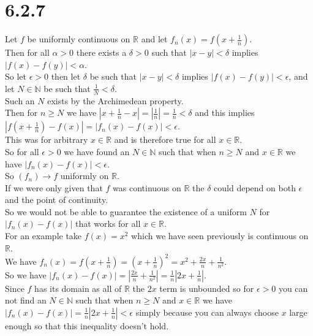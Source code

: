 \documentclass{article}
\begin{document}
\section*{6.2.7}
\begin{center}
    \doublespacing
    Let $f$ be uniformly continuous on $\mathbb{R}$ and let $f_n (x) = f(x +\frac{1}{n})$.
    \\Then for all $\alpha > 0$ there exists a $\delta > 0$ such that $|x - y| <\delta$ implies $|f(x) - f(y)| <\alpha$.
    \\So let $\epsilon > 0$ then let $\delta$ be such that $|x - y| <\delta$ implies $|f(x) - f(y)| <\epsilon$, and let $N\in\mathbb{N}$ be such that $\frac{1}{N} <\delta$.
    \\Such an $N$ exists by the Archimedean property.
    \\Then for $n\geq N$ we have $|x +\frac{1}{n} - x| = |\frac{1}{n}| =\frac{1}{n} <\delta$ and this implies $|f(x +\frac{1}{n}) - f(x)| = |f_n (x) - f(x)| <\epsilon$.
    \\This was for arbitrary $x\in\mathbb{R}$ and is therefore true for all $x\in\mathbb{R}$.
    \\So for all $\epsilon > 0$ we have found an $N\in\mathbb{N}$ such that when $n\geq N$ and $x\in\mathbb{R}$ we have $|f_n (x) - f(x)| <\epsilon$.
    \\So $(f_n)\rightarrow f$ uniformly on $\mathbb{R}$.
    \break
    \\If we were only given that $f$ was continuous on $\mathbb{R}$ the $\delta$ could depend on both $\epsilon$ and the point of continuity.
    \\So we would not be able to guarantee the existence of a uniform $N$ for $|f_n (x) - f(x)|$ that works for all $x\in\mathbb{R}$.
    \break
    \\For an example take $f(x) = x^2$ which we have seen previously is continuous on $\mathbb{R}$.
    \\We have $f_n (x) = f(x +\frac{1}{n}) = (x +\frac{1}{n})^2 = x^2 +\frac{2x}{n} +\frac{1}{n^2}$.
    \\So we have $|f_n (x) - f(x)| = |\frac{2x}{n} +\frac{1}{n^2}| =\frac{1}{n} |2x +\frac{1}{n}|$.
    \\Since $f$ has its domain as all of $\mathbb{R}$ the $2x$ term is unbounded so for $\epsilon > 0$ you can not find an $N\in\mathbb{N}$ such that when $n\geq N$ and $x\in\mathbb{R}$ we have $|f_n (x) - f(x)| =\frac{1}{n} |2x +\frac{1}{n}| <\epsilon$ simply because you can always choose $x$ large enough so that this inequality doesn't hold.
\end{center}
\end{document}
